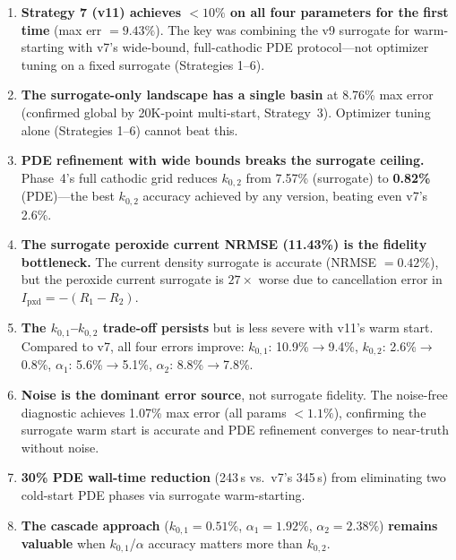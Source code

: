 \documentclass[11pt]{article}
\begin{document}
\begin{enumerate}
  \item \textbf{Strategy 7 (v11) achieves $<10\%$ on all four parameters for
        the first time} (max err $= 9.43\%$).  The key was combining the v9
        surrogate for warm-starting with v7's wide-bound, full-cathodic PDE
        protocol---not optimizer tuning on a fixed surrogate (Strategies 1--6).

  \item \textbf{The surrogate-only landscape has a single basin} at 8.76\% max
        error (confirmed global by 20K-point multi-start, Strategy~3).
        Optimizer tuning alone (Strategies 1--6) cannot beat this.

  \item \textbf{PDE refinement with wide bounds breaks the surrogate ceiling.}
        Phase~4's full cathodic grid reduces $k_{0,2}$ from 7.57\% (surrogate)
        to \textbf{0.82\%} (PDE)---the best $k_{0,2}$ accuracy achieved by any
        version, beating even v7's 2.6\%.

  \item \textbf{The surrogate peroxide current NRMSE (11.43\%) is the fidelity
        bottleneck.}  The current density surrogate is accurate (NRMSE $= 0.42\%$),
        but the peroxide current surrogate is $27\times$ worse due to cancellation
        error in $I_{\text{pxd}} = -(R_1 - R_2)$.

  \item \textbf{The $k_{0,1}$--$k_{0,2}$ trade-off persists} but is less severe
        with v11's warm start.  Compared to v7, all four errors improve:
        $k_{0,1}$: 10.9\%$\to$9.4\%,
        $k_{0,2}$: 2.6\%$\to$0.8\%,
        $\alpha_1$: 5.6\%$\to$5.1\%,
        $\alpha_2$: 8.8\%$\to$7.8\%.

  \item \textbf{Noise is the dominant error source}, not surrogate fidelity.
        The noise-free diagnostic achieves 1.07\% max error (all params $<1.1\%$),
        confirming the surrogate warm start is accurate and PDE refinement
        converges to near-truth without noise.

  \item \textbf{30\% PDE wall-time reduction} (243\,s vs.\ v7's 345\,s) from
        eliminating two cold-start PDE phases via surrogate warm-starting.

  \item \textbf{The cascade approach} ($k_{0,1} = 0.51\%$,
        $\alpha_1 = 1.92\%$, $\alpha_2 = 2.38\%$) \textbf{remains valuable}
        when $k_{0,1}$/$\alpha$ accuracy matters more than $k_{0,2}$.


\end{enumerate}
\end{document}
